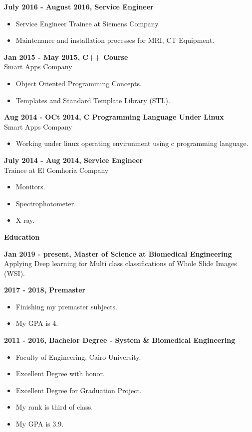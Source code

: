 \documentclass[a4paper,12pt,final]{memoir}
\newcommand{\Sep}{\vspace{1.5em}}
\newcommand{\SmallSep}{\vspace{0.5em}}
\newcommand{\CVSection}[1]
	{\Large\textbf{#1}\par
	\SmallSep\normalsize\normalfont}
\newcommand{\CVItem}[1]
	{\textbf{\color{RoyalBlue} #1}}
\begin{document}
\CVItem{July 2016 - August 2016, Service Engineer}\\
\begin{itemize}
  \item Service Engineer Trainee at Siemens Company.
  \item Maintenance and installation processes for MRI, CT Equipment.
\end{itemize}
\Sep

\CVItem{Jan 2015 - May 2015, C++ Course}\\
Smart Apps Company
\begin{itemize}
  \item Object Oriented Programming Concepts.
  \item Templates and Standard Template Library (STL).
\end{itemize}
\Sep

\CVItem{Aug 2014 - OCt 2014, C Programming Language Under Linux}\\
Smart Apps Company
\begin{itemize}
\item Working under linux operating environment using c programming language.
\end{itemize}
\Sep

\CVItem{July 2014 - Aug 2014, Service Engineer}\\
Trainee at El Gomhoria Company
\begin{itemize}
  \item Monitors.
  \item Spectrophotometer.
  \item X-ray.
\end{itemize}
\Sep

\clearpage
\framebreak
\framebreak


\CVSection{Education}
\CVItem{Jan 2019 - present, Master of Science at Biomedical Engineering}\\
Applying Deep learning for Multi class classifications of Whole Slide Images (WSI).
\SmallSep

\CVItem{2017 - 2018, Premaster}\\
\begin{itemize}
  \item Finishing my premaster subjects.
  \item My GPA is 4.
\end{itemize}
\SmallSep

\CVItem{2011 - 2016, Bachelor Degree - System \& Biomedical Engineering}\\
\begin{itemize}
  \item Faculty of Engineering, Cairo University.
  \item Excellent Degree with honor.
  \item Excellent Degree for Graduation Project.
  \item My rank is third of class.
  \item My GPA is 3.9.
\end{itemize}
\Sep
\end{document}
